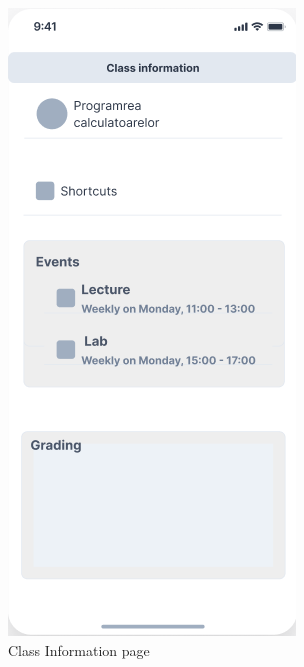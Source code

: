 \begin{figure}[!ht]
\begin{minipage}[b]{0.43\textwidth}
        \label{5:fig:eventdeatils}
    \end{minipage}
    \hfill
    \begin{minipage}[b]{0.43\textwidth}
        \captionsetup{justification=centering}
        \includegraphics[width=\textwidth]{figures/wf/image17.png}
        \caption{Class Information page}
        \label{5:fig:classinfo}
    \end{minipage}
    
\end{figure}
